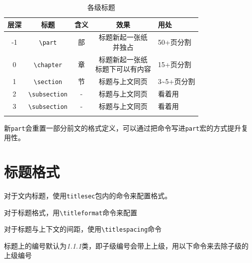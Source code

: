 \documentclass[10pt,openany]{book}
\begin{document}
\begin{center}
    \begin{longtable}{ccccl}
        \textbf{层深} & \textbf{标题}                        & \textbf{含义} & \textbf{效果}       & \textbf{用处}           \\
        \hline
        \endfirsthead
        -1          & \texttt{\textbackslash part}       & 部           & \makecell{标题新起一张纸                         \\并独占} & 50+页分割  \\
        \hline
        0           & \texttt{\textbackslash chapter}    & 章           & \makecell{标题新起一张纸                         \\标题下可以有内容} & 15+页分割\\
        \hline
        1           & \texttt{\textbackslash section}    & 节           & 标题与上文同页           & 3\textasciitilde5+页分割 \\
        \hline
        2           & \texttt{\textbackslash subsection} & -           & 标题与上文同页           & 看着用                   \\
        \hline
        3           & \texttt{\textbackslash subsection} & -           & 标题与上文同页           & 看着用                   \\
        \hline
        \caption{各级标题}
    \end{longtable}
\end{center}

新\texttt{part}会重置一部分前文的格式定义，可以通过把命令写进\texttt{part}宏的方式提升复用性。



\section{标题格式}

对于文内标题，使用\texttt{titlesec}包内的命令来配置格式。

对于标题格式，用\texttt{\textbackslash{}titleformat}命令来配置



对于标题与上下文的间距，使用\texttt{\textbackslash{}titlespacing}命令



标题上的编号默认为\textit{1.1.1}类，即子级编号会带上上级，用以下命令来去除子级的上级编号
\end{document}
